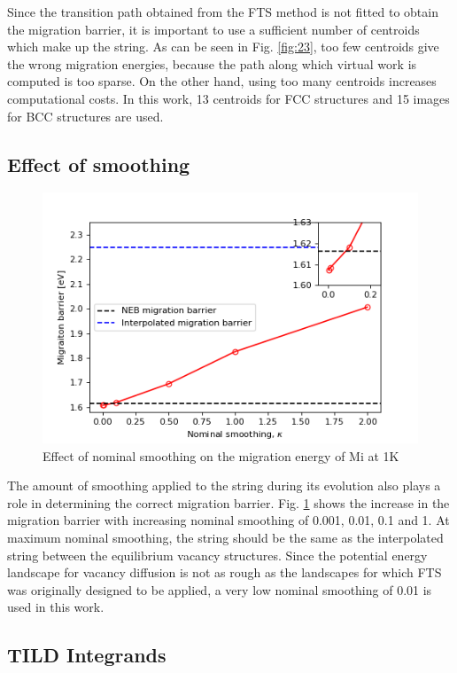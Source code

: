 \documentclass{article}
\begin{document}
Since the transition path obtained from the FTS method is not fitted to obtain the migration barrier, it is important to use a sufficient number of centroids which make up the string. As can be seen in Fig. \ref{fig:23}, too few centroids give the wrong migration energies, because the path along which virtual work is computed is too sparse. On the other hand, using too many centroids increases computational costs. In this work, 13 centroids for FCC structures and 15 images for BCC structures are used.

\subsection{Effect of smoothing}\label{smooth}

\begin{figure}[!htp]
\centering
\includegraphics[scale=0.65]{smooth}
\caption{Effect of nominal smoothing on the migration energy of Mi at 1K}
\label{fig:24}
\end{figure}

The amount of smoothing applied to the string during its evolution also plays a role in determining the correct migration barrier. Fig. \ref{fig:24} shows the increase in the migration barrier with increasing nominal smoothing of 0.001, 0.01, 0.1 and 1. At maximum nominal smoothing, the string should be the same as the interpolated string between the equilibrium vacancy structures. Since the potential energy landscape for vacancy diffusion is not as rough as the landscapes for which FTS was originally designed to be applied, a very low nominal smoothing of 0.01 is used in this work.

\subsection{TILD Integrands}
\end{document}
